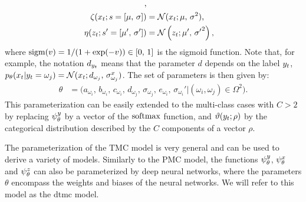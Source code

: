\begin{example}
\begin{align*}
        \text{,} \\
        \zeta(x_t; s = [\mu,\, {\sigma}] ) &=     
        \mathcal{N}(x_t; \mu,\, {\sigma}^2 )
        \text{,} \\
        \eta(z_t; s' = [\mu',\, {\sigma'}])  
        &= {\mathcal N}\left(z_t;  \mu' ,\, {\sigma'}^2 \right)   
        \text{,}
    \end{align*}
where ${\rm sigm}(v)=1/(1+\exp(-v)) \in [0,\,1]$ is the sigmoid function.
Note that, for example, the notation $d_{y_{t}}$ means that
the parameter $d$ depends on the label $y_{t}$, 
\ie~$p_{\theta}(x_t|y_{t} = \omega_j) = {\mathcal N}(x_t; d_{\omega_j},\, \sigma_{\omega_j}^{x})$.
The set of parameters is then given by:
\begin{align*}
    \theta &= \big ( a_{\omega_i},\, b_{\omega_i},\, c_{\omega_i},\, 
    d_{\omega_j},\, 
    \sigma_{\omega_j},\, e_{\omega_i},\, \sigma_{\omega_i}'
    | (\omega_i,\omega_j) \in \Omega^2 \big ) \text{.} 
\end{align*}
This parameterization can be easily extended to
the multi-class cases with $C>2$ by replacing $\psi^{y}_{\theta}$
by a vector of the ${\rm softmax}$ function, 
and $\vartheta(y_t;\rho)$ 
by the categorical distribution described
by the $C$ components of  a vector $\rho$. 
\end{example}

\begin{remark}
    \label{rem:general_param}
    The parameterization of the TMC model is very general and can be used to derive 
    a variety of models. 
    Similarly to the PMC model, the functions $\psi^{y}_{\theta}$, $\psi^{x}_{\theta}$ 
    and $\psi^{z}_{\theta}$  can also be parameterized by deep neural networks, where 
    the parameters $\theta$ encompass the 
    weights and biases of the neural networks.
    We will refer to this model as the \gls*{dtmc}
     model.
\end{remark}
       



